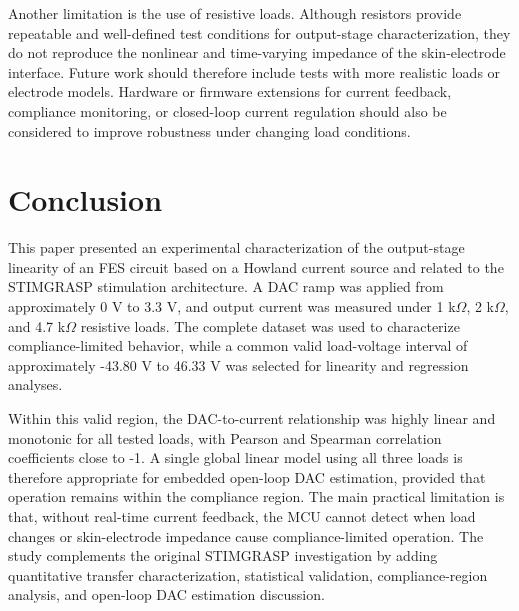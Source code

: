 \documentclass[conference]{IEEEtran}
\begin{document}
Another limitation is the use of resistive loads. Although resistors provide repeatable and well-defined test conditions for output-stage characterization, they do not reproduce the nonlinear and time-varying impedance of the skin-electrode interface. Future work should therefore include tests with more realistic loads or electrode models. Hardware or firmware extensions for current feedback, compliance monitoring, or closed-loop current regulation should also be considered to improve robustness under changing load conditions.

\section{Conclusion}

This paper presented an experimental characterization of the output-stage linearity of an FES circuit based on a Howland current source and related to the STIMGRASP stimulation architecture. A DAC ramp was applied from approximately 0 V to 3.3 V, and output current was measured under 1 k$\Omega$, 2 k$\Omega$, and 4.7 k$\Omega$ resistive loads. The complete dataset was used to characterize compliance-limited behavior, while a common valid load-voltage interval of approximately -43.80 V to 46.33 V was selected for linearity and regression analyses.

Within this valid region, the DAC-to-current relationship was highly linear and monotonic for all tested loads, with Pearson and Spearman correlation coefficients close to -1. A single global linear model using all three loads is therefore appropriate for embedded open-loop DAC estimation, provided that operation remains within the compliance region. The main practical limitation is that, without real-time current feedback, the MCU cannot detect when load changes or skin-electrode impedance cause compliance-limited operation. The study complements the original STIMGRASP investigation by adding quantitative transfer characterization, statistical validation, compliance-region analysis, and open-loop DAC estimation discussion.



\end{document}
